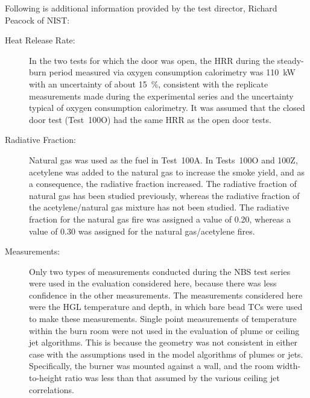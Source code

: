 Following is additional information provided by the test director, Richard Peacock of NIST:
\begin{description}
\item[Heat Release Rate:] In the two tests for which the door was open, the HRR during the steady-burn period measured via oxygen consumption calorimetry was 110~kW with an uncertainty of about 15~\%, consistent with the replicate measurements made during the experimental series and the uncertainty typical of oxygen consumption calorimetry. It was assumed that the closed door test (Test~100O) had the same HRR as the open door tests.
\item[Radiative Fraction:] Natural gas was used as the fuel in Test~100A. In Tests~100O and 100Z, acetylene was added to the natural gas to increase the smoke yield, and as a consequence, the radiative fraction increased. The radiative fraction of natural gas has been studied previously, whereas the radiative fraction of the acetylene/natural gas mixture has not been studied. The radiative fraction for the natural gas fire was assigned a value of 0.20, whereas a value of 0.30 was assigned for the natural gas/acetylene fires.
\item[Measurements:] Only two types of measurements conducted during the NBS test series were used in the evaluation considered here, because there was less confidence in the other measurements. The measurements considered here were the HGL temperature and depth, in which bare bead TCs were used to make these measurements. Single point measurements of temperature within the burn room were not used in the evaluation of plume or ceiling jet algorithms. This is because the geometry was not consistent in either case with the assumptions used in the model algorithms of plumes or jets. Specifically, the burner was mounted against a wall, and the room width-to-height ratio was less than that assumed by the various ceiling jet correlations.
\end{description}

